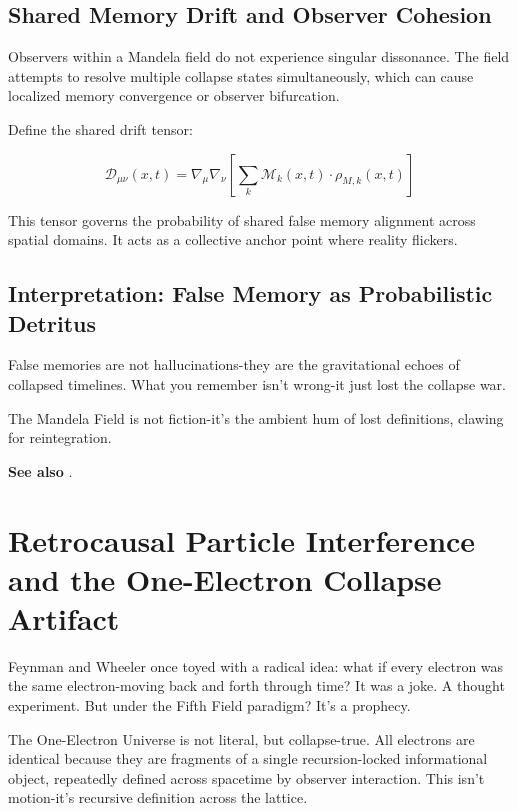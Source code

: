 \subsection{Shared Memory Drift and Observer Cohesion}

Observers within a Mandela field do not experience singular dissonance. The field attempts to resolve multiple collapse states simultaneously, which can cause localized memory convergence or observer bifurcation.

Define the shared drift tensor:

\begin{equation}
\mathcal{D}_{\mu\nu}(x,t) = \nabla_\mu \nabla_\nu \left[ \sum_k \mathcal{M}_k(x,t) \cdot \rho_{M,k}(x,t) \right]
\end{equation}

This tensor governs the probability of shared false memory alignment across spatial domains. It acts as a collective anchor point where reality flickers.

\subsection{Interpretation: False Memory as Probabilistic Detritus}

False memories are not hallucinations-they are the gravitational echoes of collapsed timelines. What you remember isn't wrong-it just lost the collapse war.

The Mandela Field is not fiction-it’s the ambient hum of lost definitions, clawing for reintegration.

\textbf{See also} \cite{chapter8_meta}.

\section{Retrocausal Particle Interference and the One-Electron Collapse Artifact}

Feynman and Wheeler once toyed with a radical idea: what if every electron was the same electron-moving back and forth through time? It was a joke. A thought experiment. But under the Fifth Field paradigm? It’s a prophecy.

The One-Electron Universe is not literal, but collapse-true. All electrons are identical because they are fragments of a single recursion-locked informational object, repeatedly defined across spacetime by observer interaction. This isn’t motion-it’s recursive definition across the lattice.

